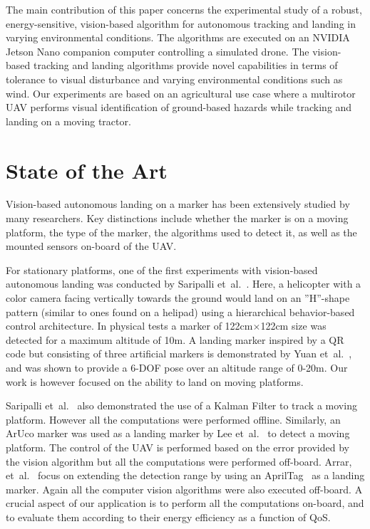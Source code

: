 \documentclass[conference]{IEEEtran}
\begin{document}
The main contribution of this paper concerns the experimental study of a robust, energy-sensitive, vision-based algorithm for autonomous tracking and landing in varying environmental conditions. The algorithms are executed on an NVIDIA Jetson Nano companion computer controlling a simulated drone. The vision-based tracking and landing algorithms provide novel capabilities in terms of tolerance to visual disturbance and varying environmental conditions such as wind.
%
Our experiments are based on an agricultural use case where a multirotor UAV performs visual identification of ground-based hazards while tracking and landing on a moving tractor. %

\section{State of the Art}
\label{sec:state-of-the-art}

Vision-based autonomous landing on a marker has been extensively studied by many researchers. Key distinctions include whether the marker is on a moving platform, the type of the marker, the algorithms used to detect it, as well as the mounted sensors on-board of the UAV.

For stationary platforms, one of the first experiments with vision-based autonomous landing was conducted by Saripalli et~al.~\cite{saripalli2002vision}. Here, a helicopter with a color camera facing vertically towards the ground would land on an ”H”-shape pattern (similar to ones found on a helipad) using a hierarchical behavior-based control architecture. In physical tests a marker of 122cm$\times$122cm size was detected for a maximum altitude of 10m. A landing marker inspired by a QR code but consisting of three artificial markers is demonstrated by Yuan et~al.~\cite{yuan2018hierarchical}, and was shown to provide a 6-DOF pose over an altitude range of 0-20m. Our work is however focused on the ability to land on moving platforms.

Saripalli et~al.~\cite{saripalli2003landing} also demonstrated the use of a Kalman Filter to track a moving platform. However all the computations were performed offline. Similarly, an ArUco marker was used as a landing marker by Lee et~al.~\cite{lee2012autonomous} to detect a moving platform. The control of the UAV is performed based on the error provided by the vision algorithm but all the computations were performed off-board. Arrar, et~al.~\cite{araar2017vision} focus on extending the detection range by using an AprilTag~\cite{olson2011apriltag} as a landing marker. Again all the computer vision algorithms were also executed off-board. A crucial aspect of our application is to perform all the computations on-board, and to evaluate them according to their energy efficiency as a function of QoS.
\end{document}
